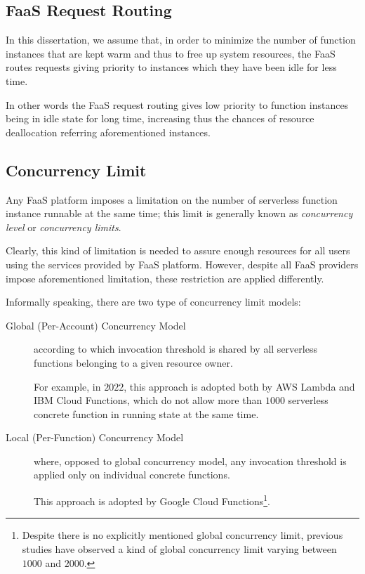 \documentclass[12pt,a4paper]{report}
\begin{document}
\subsection{FaaS Request Routing}

In this dissertation, we assume that, in order to minimize the number of
function instances that are kept warm and thus to free up system resources, the FaaS routes requests giving priority to instances which they have been idle for less time.

In other words the FaaS request routing gives low priority to function instances being in idle state for long time, increasing thus the chances of resource deallocation referring aforementioned instances.

\subsection{Concurrency Limit}

Any FaaS platform imposes a limitation on the number of serverless function instance runnable at the same time; this limit is generally known as \textit{concurrency level} or \textit{concurrency limits}. 

Clearly, this kind of limitation is needed to assure enough resources for all users using the services provided by FaaS platform. However, despite all FaaS providers impose aforementioned limitation, these restriction are applied differently.

Informally speaking, there are two type of concurrency limit models:

\begin{description}
	\item[Global (Per-Account) Concurrency Model] according to which invocation threshold is shared by all serverless functions belonging to a given resource owner. 
	
	For example, in $2022$, this approach is adopted both by AWS Lambda and IBM Cloud Functions, which do not allow more than $1000$ serverless concrete function in running state at the same time.
	
	\item[Local (Per-Function) Concurrency Model] where, opposed to global concurrency model, any invocation threshold is applied only on individual concrete functions. 
	
	This approach is adopted by Google Cloud Functions\footnote{Despite there is no explicitly mentioned global concurrency limit, previous studies have observed a kind of global concurrency limit varying between $1000$ and $2000$.}.
	
\end{description}
\end{document}
